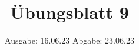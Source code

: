 

\title{Übungsblatt 9}
\date{%
  Ausgabe: 16.06.23 %
  \hspace{3em}
  Abgabe: 23.06.23 %
}



\maketitle
\thispagestyle{empty}
\tableofcontents
\newpage







